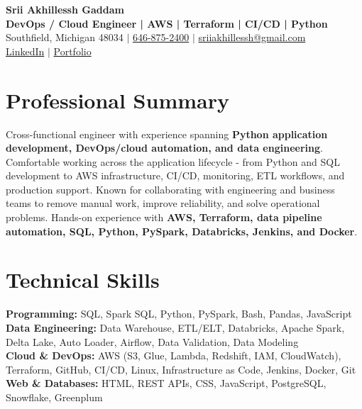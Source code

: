 \documentclass[letterpaper,10pt]{article}
\begin{document}
\fontsize{9.35pt}{10.45pt}\selectfont

\begin{center}
    {\LARGE \textbf{Srii Akhillessh Gaddam}} \\[-1pt]
    \textbf{DevOps / Cloud Engineer | AWS | Terraform | CI/CD | Python} \\[2pt]
    Southfield, Michigan 48034 $|$
    \href{tel:6468752400}{646-875-2400} $|$
    \href{mailto:sriiakhillessh@gmail.com}{sriiakhillessh@gmail.com} \\[1pt]
    \href{https://www.linkedin.com/in/srii-akhiilessh-gaddam-b48668191/}{LinkedIn} $|$
    \href{https://sriiakhillesshg.github.io/portfolio/}{Portfolio}
\end{center}
\vspace{-8pt}

\section{Professional Summary}
\small{Cross-functional engineer with experience spanning \textbf{Python application development, DevOps/cloud automation, and data engineering}. Comfortable working across the application lifecycle - from Python and SQL development to AWS infrastructure, CI/CD, monitoring, ETL workflows, and production support. Known for collaborating with engineering and business teams to remove manual work, improve reliability, and solve operational problems. Hands-on experience with \textbf{AWS, Terraform, data pipeline automation, SQL, Python, PySpark, Databricks, Jenkins, and Docker}.}

\section{Technical Skills}
\small{
\textbf{Programming:} SQL, Spark SQL, Python, PySpark, Bash, Pandas, JavaScript \\
\textbf{Data Engineering:} Data Warehouse, ETL/ELT, Databricks, Apache Spark, Delta Lake, Auto Loader, Airflow, Data Validation, Data Modeling \\
\textbf{Cloud \& DevOps:} AWS (S3, Glue, Lambda, Redshift, IAM, CloudWatch), Terraform, GitHub, CI/CD, Linux, Infrastructure as Code, Jenkins, Docker, Git \\
\textbf{Web \& Databases:} HTML, REST APIs, CSS, JavaScript, PostgreSQL, Snowflake, Greenplum
}
\end{document}
